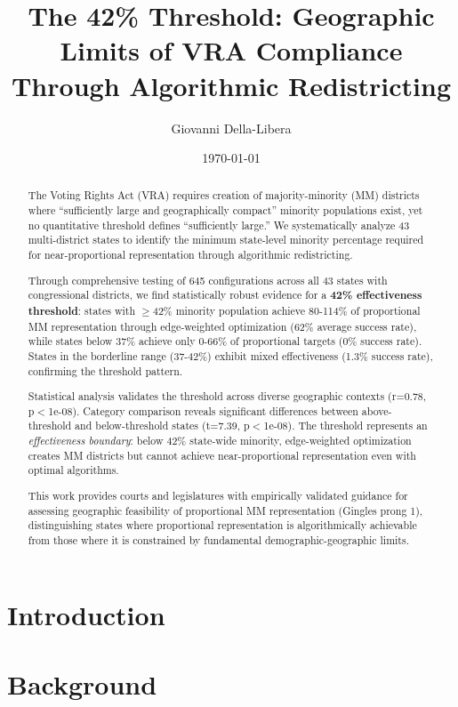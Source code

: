 \documentclass[12pt]{article}
\title{The 42\% Threshold: Geographic Limits of VRA Compliance Through Algorithmic Redistricting}
\author{Giovanni Della-Libera}
\date{\today}
\begin{document}
\maketitle

\begin{abstract}
The Voting Rights Act (VRA) requires creation of majority-minority (MM) districts where ``sufficiently large and geographically compact'' minority populations exist, yet no quantitative threshold defines ``sufficiently large.'' We systematically analyze 43 multi-district states to identify the minimum state-level minority percentage required for near-proportional representation through algorithmic redistricting.

Through comprehensive testing of 645 configurations across all 43 states with congressional districts, we find statistically robust evidence for a \textbf{42\% effectiveness threshold}: states with $\geq$42\% minority population achieve 80-114\% of proportional MM representation through edge-weighted optimization (62\% average success rate), while states below 37\% achieve only 0-66\% of proportional targets (0\% success rate). States in the borderline range (37-42\%) exhibit mixed effectiveness (1.3\% success rate), confirming the threshold pattern.

Statistical analysis validates the threshold across diverse geographic contexts (r=0.78, p$<$1e-08). Category comparison reveals significant differences between above-threshold and below-threshold states (t=7.39, p$<$1e-08). The threshold represents an \textit{effectiveness boundary}: below 42\% state-wide minority, edge-weighted optimization creates MM districts but cannot achieve near-proportional representation even with optimal algorithms.

This work provides courts and legislatures with empirically validated guidance for assessing geographic feasibility of proportional MM representation (Gingles prong 1), distinguishing states where proportional representation is algorithmically achievable from those where it is constrained by fundamental demographic-geographic limits.
\end{abstract}

\section{Introduction}


\section{Background}

\end{document}
